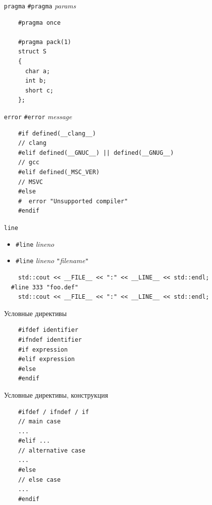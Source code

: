 \documentclass[unknownkeysallowed,xcolor=table]{beamer}
\begin{document}
\begin{frame}[fragile]{\lstinline{pragma}}
  \lstinline{#pragma} \emph{params}

  \begin{lstlisting}
    #pragma once

    #pragma pack(1)
    struct S
    {
      char a;
      int b;
      short c;
    };
  \end{lstlisting}
\end{frame}

\begin{frame}[fragile]{\lstinline{error}}
  \lstinline{#error} \emph{message}

  \begin{lstlisting}
    #if defined(__clang__)
    // clang
    #elif defined(__GNUC__) || defined(__GNUG__)
    // gcc
    #elif defined(_MSC_VER)
    // MSVC
    #else
    #  error "Unsupported compiler"
    #endif
  \end{lstlisting}
\end{frame}

\begin{frame}[fragile]{\lstinline{line}}
  \begin{itemize}
    \item \lstinline{#line} \emph{lineno}
    \item \lstinline{#line} \emph{lineno} \lstinline{"}\emph{filename}\lstinline{"}
  \end{itemize}
  \begin{lstlisting}
    std::cout << __FILE__ << ":" << __LINE__ << std::endl;
  #line 333 "foo.def"
    std::cout << __FILE__ << ":" << __LINE__ << std::endl;
  \end{lstlisting}
\end{frame}

\begin{frame}[fragile]{Условные директивы}
  \begin{lstlisting}
    #ifdef identifier
    #ifndef identifier
    #if expression
    #elif expression
    #else
    #endif
  \end{lstlisting}
\end{frame}

\begin{frame}[fragile]{Условные директивы, конструкция}
  \begin{lstlisting}
    #ifdef / ifndef / if
    // main case
    ...
    #elif ...
    // alternative case
    ...
    #else
    // else case
    ...
    #endif
  \end{lstlisting}
\end{frame}
\end{document}
